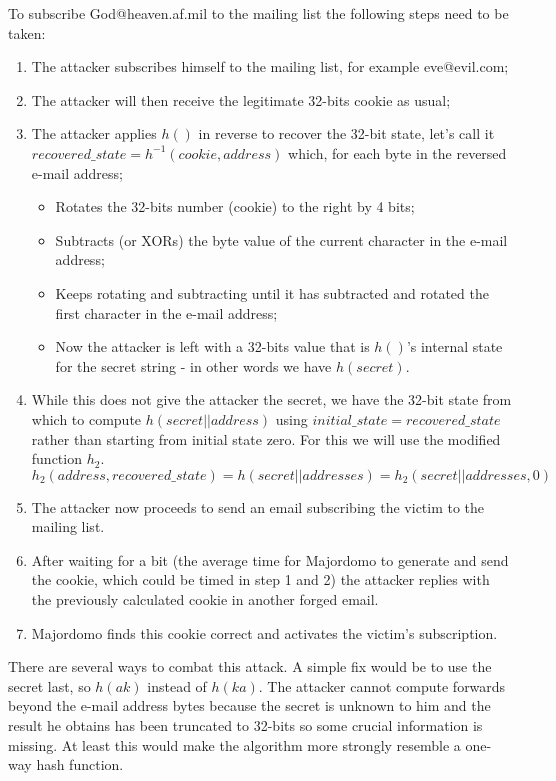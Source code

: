 \documentclass{article}
\begin{document}
To subscribe God@heaven.af.mil to the mailing list the following steps need to be taken:
\begin{enumerate}
	\item The attacker subscribes himself to the mailing list, for example eve@evil.com;
	\item The attacker will then receive the legitimate 32-bits cookie as usual;
	\item The attacker applies $h()$ in reverse to recover the 32-bit state, let's call it $recovered\_state = h^{-1}(cookie, address)$ which, for each byte in the reversed e-mail address;
		\begin{itemize}
		\item Rotates the 32-bits number (cookie) to the right by 4 bits;
		\item Subtracts (or XORs) the byte value of the current character in the e-mail address;
		\item Keeps rotating and subtracting until it has subtracted and rotated the first character in the e-mail address;
		\item Now the attacker is left with a 32-bits value that is $h()$'s internal state for the secret string - in other words we have $h(secret)$.
		\end{itemize}
	\item While this does not give the attacker the secret, we have the 32-bit state from which to compute $h(secret||address)$ using $initial\_state = recovered\_state$ rather than starting from initial state zero.
	For this we will use the modified function $h_2$.
\[ h_2(address, recovered\_state) = h(secret||addresses) = h_2(secret||addresses,0) \]
	\item The attacker now proceeds to send an email subscribing the victim to the mailing list.
	\item After waiting for a bit (the average time for Majordomo to generate and send the cookie, which could be timed in step 1 and 2) the attacker replies with the previously calculated cookie in another forged email.
	\item Majordomo finds this cookie correct and activates the victim's subscription.
\end{enumerate}
	
There are several ways to combat this attack.
A simple fix would be to use the secret last, so $h(ak)$ instead of $h(ka)$.
The attacker cannot compute forwards beyond the e-mail address bytes because the secret is unknown to him and the result he obtains has been truncated to 32-bits so some crucial information is missing.
At least this would make the algorithm more strongly resemble a one-way hash function.
\end{document}
